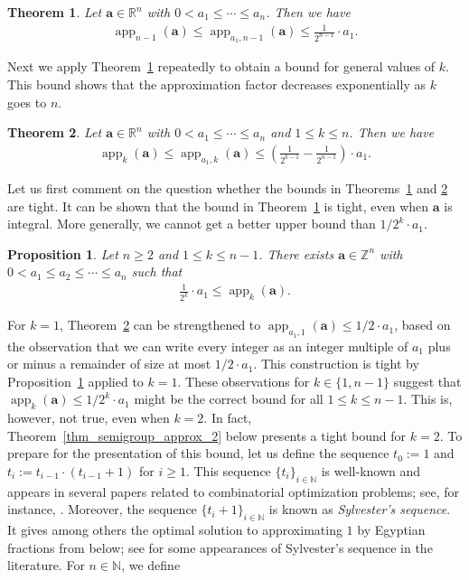 \documentclass[pdflatex]{sn-jnl}
\DeclareMathOperator{\app}{app}
\newcommand{\R}{\mathbb{R}}
\newcommand{\Z}{\mathbb{Z}}
\newcommand{\N}{\mathbb{N}}
\newcommand{\ba}{\bm{a}}
\theoremstyle{thmstyleone}%
\newtheorem{theorem}{Theorem}%
\newtheorem{proposition}{Proposition}
\theoremstyle{thmstyletwo}%
\theoremstyle{thmstylethree}%
\begin{document}
	\begin{theorem}
		\label{thm_semigroup_m_1_n-1}
		Let $\ba\in\R^{n}$ with $0 < a_1\leq \cdots\leq a_n$. Then we have
		\begin{align*}
			\app_{n-1}(\ba)\leq\app_{a_1,n-1}(\ba)\leq\frac{1}{2^{n-1}}\cdot a_1.
		\end{align*}
	\end{theorem}
	Next we apply Theorem~\ref{thm_semigroup_m_1_n-1}  repeatedly to obtain a bound for general values of $k$. This bound shows that the approximation factor decreases exponentially as $k$ goes to $n$. 
	\begin{theorem}
		\label{thm_semigroup_knapsack}
		Let $\ba\in\R^{n}$ with $0 < a_1\leq \cdots\leq a_n$ and $1\leq k\leq n$. Then we have
		\begin{align*}
			\app_k(\ba) \leq \app_{a_1,k}(\ba)\leq \left(\frac{1}{2^{k-1}} - \frac{1}{2^{n-1}}\right)\cdot a_1.
		\end{align*}
	\end{theorem}
	Let us first comment on the question whether the bounds in Theorems~\ref{thm_semigroup_m_1_n-1} and  \ref{thm_semigroup_knapsack} are tight. 
	It can be shown that the bound in Theorem~\ref{thm_semigroup_m_1_n-1} is tight, even when $\ba$ is integral. More generally, we cannot get a better upper bound than $1/2^k\cdot a_1$.
	\begin{proposition}
		\label{prop_semigroup_lower_bound_m_1_n-1}
		Let $n\geq 2$ and $1\leq k\leq n - 1$. There exists $\ba\in \Z^{n}$ with $0< a_1\leq a_2\leq\cdots\leq a_n$ such that 
		\begin{align*}
			\frac{1}{2^{k}}\cdot a_1\leq \app_{k}(\ba).
		\end{align*}
	\end{proposition}
	For $k = 1$, Theorem~\ref{thm_semigroup_knapsack} can be strengthened to $\app_{a_1,1}(\ba)\leq 1/2\cdot a_1$, based on the observation that we can write every integer as an integer multiple of $a_1$ plus or minus a remainder of size at most $1/2\cdot a_1$. This construction is tight by Proposition~\ref{prop_semigroup_lower_bound_m_1_n-1} applied to $k=1$. These observations for $k\in\lbrace 1,n-1\rbrace$ suggest that $\app_k(\ba) \leq 1/2^k\cdot a_1$ might be the correct bound for all $1\leq k \leq n - 1$.  
	This is, however, not true, even when $k = 2$. 
	In fact, Theorem~\ref{thm_semigroup_approx_2} below presents a tight bound for $k = 2$. 
	To prepare for the presentation of this bound, let us  define the sequence $t_0 := 1$ and $t_i := t_{i-1}\cdot (t_{i-1} + 1)$ for $i\geq 1$. This sequence $\lbrace t_i\rbrace_{i\in \N}$ is well-known and appears in several papers related to combinatorial optimization problems; see, for instance,  \cite{galawoeginger1995on-linebinpacking,kohlikrishna1992greedyknapsack,seidenwoeginger2005twodimcuttingstock}. Moreover, the sequence $\lbrace t_i + 1\rbrace_{i\in \N}$ is known as \emph{Sylvester's sequence}. It gives among others the optimal solution to approximating $1$ by Egyptian fractions from below; see \cite{curtiss1922kelloggs,nathanson2023underapproxegyptian,oeissylvester,soundararajan2005approx_one_below} for some appearances of Sylvester's sequence in the literature. For $n\in \N$, we define 
\end{document}
